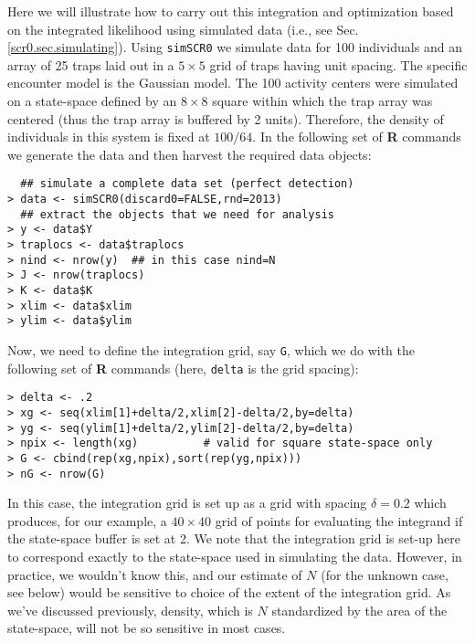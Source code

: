 Here we will illustrate how to carry out this integration and
optimization based on the integrated likelihood using simulated data
(i.e., see Sec. \ref{scr0.sec.simulating}). Using \mbox{\tt simSCR0}
we simulate data for 100 individuals and an array of 25 traps laid out
in a $5 \times 5$ grid of traps having unit spacing.  The specific
encounter model is the Gaussian model. The 100 activity centers were
simulated on a state-space defined by an $8 \times 8$ square within
which the trap array was centered (thus the trap array is buffered by
2 units). Therefore, the density of individuals in this system is
fixed at $100/64$.  In the following set of {\bf R} commands we
generate the data and then harvest the required data objects: {\small
\begin{verbatim}
  ## simulate a complete data set (perfect detection)
> data <- simSCR0(discard0=FALSE,rnd=2013)
  ## extract the objects that we need for analysis
> y <- data$Y
> traplocs <- data$traplocs
> nind <- nrow(y)  ## in this case nind=N
> J <- nrow(traplocs)
> K <- data$K
> xlim <- data$xlim
> ylim <- data$ylim
\end{verbatim}
}
{\flushleft Now,} we need to define the integration grid, say
\mbox{\tt G}, which we do with
the following set of {\bf R} commands (here, \mbox{\tt delta} is the grid spacing):
{\small
\begin{verbatim}
> delta <- .2
> xg <- seq(xlim[1]+delta/2,xlim[2]-delta/2,by=delta) 
> yg <- seq(ylim[1]+delta/2,ylim[2]-delta/2,by=delta) 
> npix <- length(xg)          # valid for square state-space only
> G <- cbind(rep(xg,npix),sort(rep(yg,npix)))
> nG <- nrow(G)
\end{verbatim}
} 
{\flushleft In this case}, the integration grid is set up as a grid
with spacing $\delta = 0.2$ which produces, for our example, a $40
\times 40$ grid of points for evaluating the integrand if the
state-space buffer is set at 2. We note that the integration grid is
set-up here to correspond exactly to the state-space used in
simulating the data. However, in practice, we wouldn't know this, and
our estimate of $N$ (for the unknown case, see below) would be
sensitive to choice of the extent of the integration grid. As we've
discussed previously, density, which is $N$ standardized by the area
of the state-space, will not be so sensitive in most cases.

